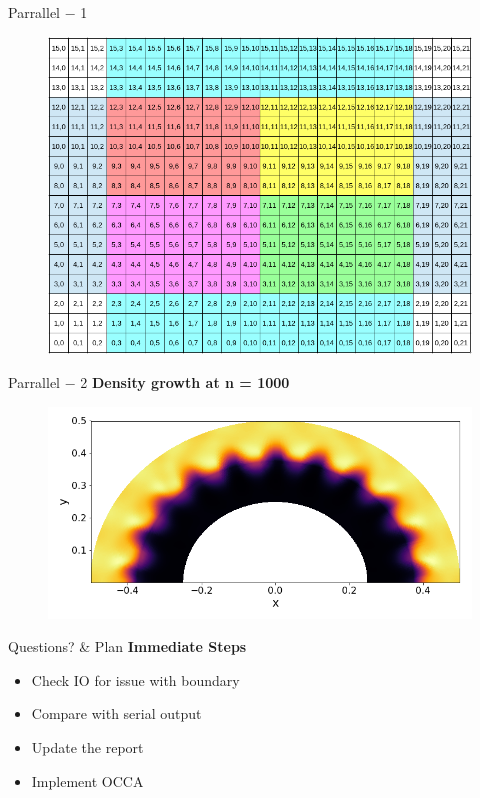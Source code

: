 \begin{frame}[t]{Parrallel $-$ 1}
  \vspace{-0.5cm}
 \begin{figure}[!htbp]
   \includegraphics[width=0.65\linewidth]{../fig/16x10compDomain}
   \centering
 \end{figure}
\end{frame}

\begin{frame}[t]{Parrallel $-$ 2}
  \textbf{Density growth at n = 1000}
 \begin{figure}[!htbp]
   \includegraphics[width=0.85\linewidth]{fig/360x300parr2}
   \centering
 \end{figure}
\end{frame}

\begin{frame}[t,fragile]{Questions? \& Plan}
  \textbf{Immediate Steps}
  \begin{itemize}
    \item Check IO for issue with boundary
    \item Compare with serial output
    \item Update the report
    \item Implement OCCA
  \end{itemize}
\end{frame}



